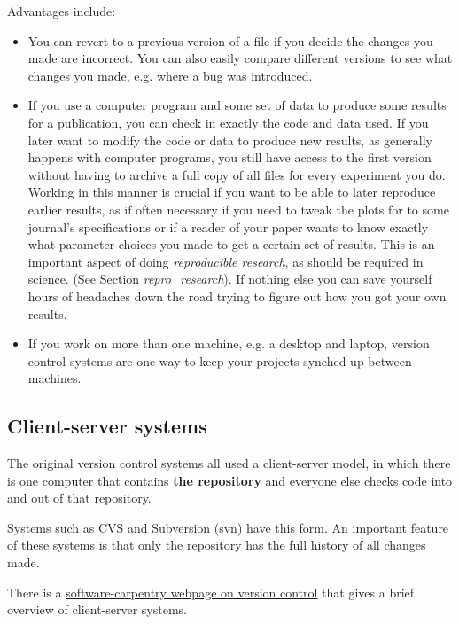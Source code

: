 \documentclass[letterpaper,10pt,english]{sphinxmanual}
\begin{document}
Advantages include:
\begin{itemize}
\item {} 
You can revert to a previous version of a file if you decide the changes
you made are incorrect.  You can also easily compare different versions
to see what changes you made, e.g. where a bug was introduced.

\item {} 
If you use a computer program and some set of data to produce some
results for a publication, you can check in exactly the code and data
used.  If you later want to modify the code or data to produce new results,
as generally happens with computer programs, you still have access to the
first version without having to archive a full copy of all files for
every experiment you do.  Working in this manner is crucial if you want
to be able to later reproduce earlier results, as if often necessary if
you need to tweak the plots for to some journal's specifications or if a
reader of your paper wants to know exactly what parameter choices you
made to get a certain set of results.   This is an important aspect of
doing \emph{reproducible research}, as should be required in science.  (See
Section \emph{repro\_research}).  If nothing else you can save yourself
hours of headaches down the road trying to figure out how you got your
own results.

\item {} 
If you work on more than one machine, e.g. a desktop and laptop, version
control systems are one way to keep your projects synched up between
machines.

\end{itemize}


\subsection{Client-server systems}
\label{versioncontrol:client-server-systems}
The original version control systems all used a client-server model, in
which there is one computer that contains \textbf{the repository} and everyone
else checks code into and out of that repository.

Systems such as CVS and Subversion (svn) have this form.
An important feature of these systems is that only the repository has the
full history of all changes made.

There is a \href{http://software-carpentry.org/4\_0/vc/}{software-carpentry webpage on version control} that gives a brief overview
of client-server systems.
\end{document}

